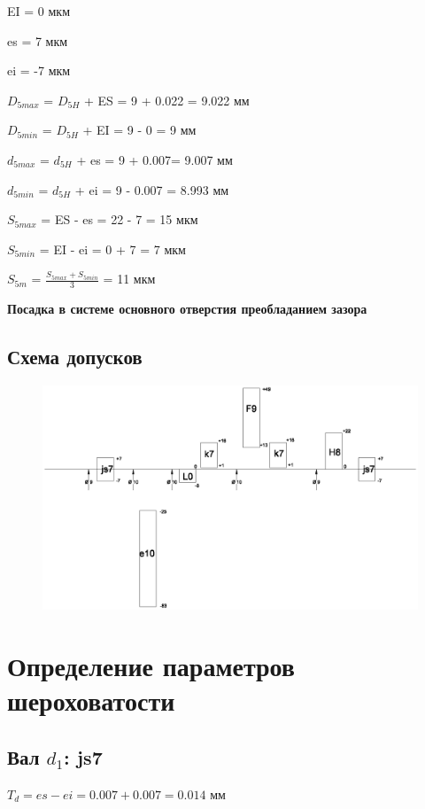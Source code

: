 \documentclass[a4paper,fontsize=12pt]{article}
\begin{document}
EI = 0 мкм

es = 7 мкм

ei = -7 мкм

$D_{5max}$ = $D_{5H}$ + ES = 9 + 0.022 = 9.022 мм

$D_{5min}$ = $D_{5H}$ + EI = 9 - 0 = 9 мм

$d_{5max}$ = $d_{5H}$ + es = 9 + 0.007= 9.007 мм

$d_{5min}$ = $d_{5H}$ + ei = 9 - 0.007 = 8.993 мм

$S_{5max}$ = ES - es = 22 - 7 = 15 мкм

$S_{5min}$ = EI - ei = 0 + 7 = 7 мкм

$S_{5m}$ = $\frac{S_{5max} + S_{5min}}{3}$ = 11 мкм

\textbf{Посадка в системе основного отверстия преобладанием зазора}

\subsection{Схема допусков}
\begin{figure}[h]
    \centering
    \includegraphics[width=16cm]{images/draw3.eps}
    \label{fig:draw}
\end{figure}


\section{Определение параметров шероховатости}

\subsection{Вал $d_1$:  js7}

$T_d = es - ei = 0.007 + 0.007 = 0.014$ мм
\end{document}

